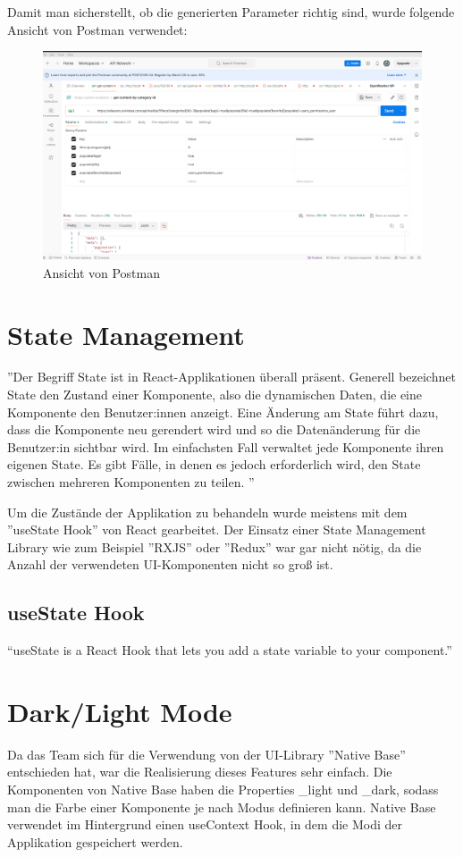 Damit man sicherstellt, ob die generierten Parameter richtig sind, wurde folgende Ansicht von Postman verwendet:
\begin{figure}[H]
  \centering
  \includegraphics[width=\textwidth]{./pics/postman.png}
  \caption{Ansicht von Postman}

\end{figure}


\section{State Management}
''Der Begriff State ist in React-Applikationen überall präsent. Generell
bezeichnet State den Zustand einer Komponente,
also die dynamischen Daten, die eine Komponente den Benutzer:innen anzeigt.
Eine Änderung am State führt dazu, dass die Komponente neu gerendert wird
und so die Datenänderung für die Benutzer:in sichtbar wird.
Im einfachsten Fall verwaltet jede Komponente ihren eigenen State.
Es gibt Fälle, in denen es jedoch erforderlich wird,
den State zwischen mehreren Komponenten zu teilen.
''
\cite{state-management}

Um die Zustände der Applikation zu behandeln wurde meistens mit dem ''useState Hook'' von React gearbeitet.
Der Einsatz einer State Management Library wie zum Beispiel ''RXJS'' oder ''Redux'' war gar nicht nötig, da die Anzahl der verwendeten UI-Komponenten nicht so groß ist.

\subsection{useState Hook}
``useState is a React Hook that lets you add a state variable to your component.'' \cite{useState}


\section{Dark/Light Mode}
Da das Team sich für die Verwendung von der UI-Library ''Native Base'' entschieden hat, war die Realisierung dieses Features sehr einfach.
Die Komponenten von Native Base haben die Properties \_light und \_dark, sodass man die Farbe einer Komponente je nach Modus definieren kann.
Native Base verwendet im Hintergrund einen useContext Hook, in dem die Modi der Applikation gespeichert werden.
